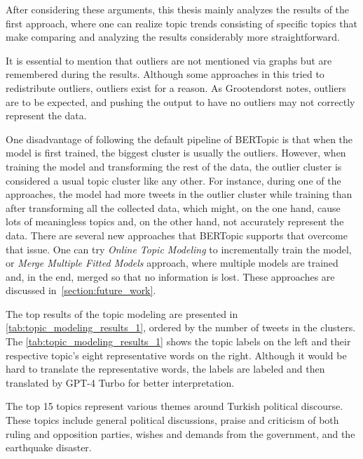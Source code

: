 After considering these arguments, this thesis mainly analyzes the results of the first approach, 
where one can realize topic trends consisting of specific topics that make comparing and analyzing 
the results considerably more straightforward.

It is essential to mention that outliers are not mentioned via graphs but are remembered 
during the results. Although some approaches in this tried to redistribute outliers, outliers 
exist for a reason. As Grootendorst notes, outliers are to be expected, and pushing the 
output to have no outliers may not correctly represent the data. 

One disadvantage of following the default pipeline of BERTopic is that when the model is first trained, 
the biggest cluster is usually the outliers. However, when training the model and transforming 
the rest of the data, the outlier cluster is considered a usual topic cluster like any other. 
For instance, during one of the approaches, the model had more tweets in the outlier cluster 
while training than after transforming all the collected data, which might, on the one hand, 
cause lots of meaningless topics and, on the other hand, not accurately represent the data. 
There are several new approaches that BERTopic supports that overcome that issue. 
One can try \textit{Online Topic Modeling} to incrementally train the model, or 
\textit{Merge Multiple Fitted Models} approach, where multiple models are trained and, in the end, 
merged so that no information is lost. These approaches are discussed in~\autoref{section:future_work}.
% 

The top results of the topic modeling are presented in \autoref{tab:topic_modeling_results_1}, 
ordered by the number of tweets in the clusters. The \autoref{tab:topic_modeling_results_1} shows 
the topic labels on the left and their respective topic's eight representative words on the right. 
Although it would be hard to translate the representative words, the labels are labeled and then 
translated by GPT-4 Turbo for better interpretation. 

The top 15 topics represent various themes around Turkish political discourse. These topics include 
general political discussions, praise and criticism of both ruling and opposition parties, 
wishes and demands from the government, and the earthquake disaster. 

